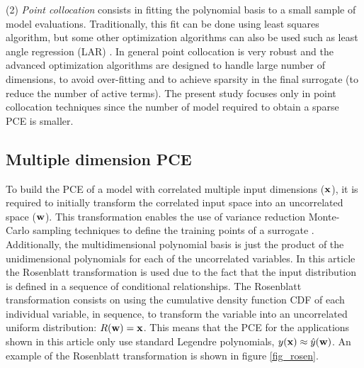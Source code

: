 \documentclass[preprint,12pt]{elsarticle}
\begin{document}
(2) \emph{Point collocation} consists in fitting the polynomial basis to a small sample of model evaluations. Traditionally, this fit can be done using least squares algorithm, but some other optimization algorithms can also be used such as least angle regression (LAR) \cite{blatman2011adaptive}. In general point collocation is very robust and the advanced optimization algorithms are designed to handle large number of dimensions, to avoid over-fitting and to achieve sparsity in the final surrogate (to reduce the number of active terms). The present study focuses only in point collocation techniques since the number of model required to obtain a sparse PCE is smaller.

\subsection{Multiple dimension PCE}

To build the PCE of a model with correlated multiple input dimensions ($\mathbf{x}$), it is required to initially transform the correlated input space into an uncorrelated space ($\mathbf{w}$). This transformation enables the use of variance reduction Monte-Carlo sampling techniques to define the training points of a surrogate \cite{feinberg2015chaospy}. Additionally, the multidimensional polynomial basis is just the product of the unidimensional polynomials for each of the uncorrelated variables. In this article the Rosenblatt transformation \cite{rosenblatt1952} is used due to the fact that the input distribution is defined in a sequence of conditional relationships. The Rosenblatt transformation consists on using the cumulative density function CDF of each individual variable, in sequence, to transform the variable into an uncorrelated uniform distribution: $R(\mathbf{w})=\mathbf{x}$. This means that the PCE for the applications shown in this article only use standard Legendre polynomials, $y(\mathbf{x})\approx \hat{y}(\mathbf{w})$. An example of the Rosenblatt transformation is shown in figure \ref{fig_rosen}.
\end{document}
